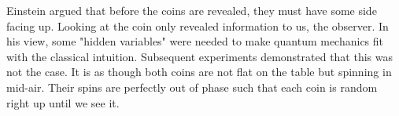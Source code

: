Einstein argued that before the coins are revealed, they must have some side facing up. Looking at the coin only revealed information to us, the observer. In his view, some "hidden variables" were needed to make quantum mechanics fit with the classical intuition. Subsequent experiments demonstrated that this was not the case. It is as though both coins are not flat on the table but spinning in mid-air. Their spins are perfectly out of phase such that each coin is random right up until we see it. 









